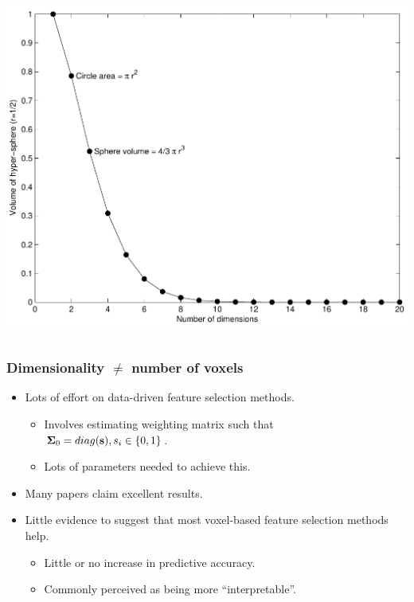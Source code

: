 \begin{frame}
\begin{columns}[c]
\includegraphics[width=\textwidth]{corners}
\end{columns}
\end{frame}




\begin{frame}
\frametitle{Dimensionality $\ne$ number of voxels}
\begin{itemize}
\item Lots of effort on data-driven feature selection methods.
\begin{itemize}
\item Involves estimating weighting matrix such that\\
      $\boldsymbol\Sigma_0 = diag({\bf s}), s_i \in \{0,1\}$.
\item Lots of parameters needed to achieve this.
\end{itemize}
\item Many papers claim excellent results.
\item Little evidence to suggest that most voxel-based feature selection methods help.
\begin{itemize}
\item Little or no increase in predictive accuracy.
\item Commonly perceived as being more ``interpretable''.
\end{itemize}
\end{itemize}
\end{frame}

